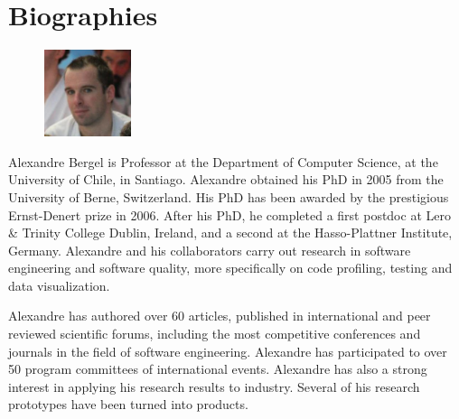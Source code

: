 \documentclass[a4paper,10pt,twoside]{book}
\begin{document}
	\sloppy
	\frontmatter
\fi
\chapter{Biographies}

\begin{figure}
\centering
\includegraphics[width=1in]{alexandre}
\end{figure}

Alexandre Bergel is Professor at the Department of Computer Science, at the University of Chile, in Santiago.
Alexandre obtained his PhD in 2005 from the University of Berne, Switzerland. His PhD has been awarded by the prestigious Ernst-Denert prize in 2006. After his PhD, he completed a first postdoc at Lero \& Trinity College Dublin, Ireland, and a second at the Hasso-Plattner Institute, Germany. Alexandre and his collaborators carry out research in software engineering and software quality, more specifically on code profiling, testing and data visualization.

Alexandre has authored over 60 articles, published in international and peer reviewed scientific forums, including the most competitive conferences and journals in the field of software engineering. Alexandre has participated to over 50 program committees of international events. Alexandre has also a strong interest in applying his research results to industry. Several of his research prototypes have been turned into products.

\end{document}
